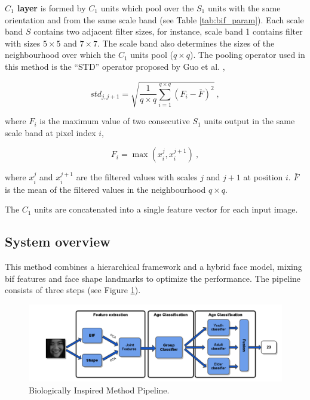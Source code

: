 \textbf{$C_1$ layer} is formed by $C_1$ units which pool over the $S_1$ units with the same orientation and from the same scale band (see Table \ref{tab:bif_param}). Each scale band $S$ contains two adjacent filter sizes, for instance, scale band 1 contains filter with sizes $5\times5$ and $7\times7$. The scale band also determines the sizes of the neighbourhood over which the $C_1$ units pool ($q\times q$). The pooling operator used in this method is the ``STD'' operator proposed by Guo et al. \cite{conf/cvpr/GuoMFH09},

\begin{equation}
std_{j,j+1} = \sqrt{\frac{1}{q\times q}\sum_{i=1}^{q\times q}(F_i - \bar{F})^2} \ ,
\end{equation}

where $F_i$ is the maximum value of two consecutive $S_1$ units output in the same scale band at pixel index $i$, 

\begin{equation}
F_i = \max(x_i^j,x_i^{j+1})\ ,
\end{equation}

where $x_i^j$ and $x_i^{j+1}$ are the filtered values with scales $j$ and $j+1$ at position $i$. $\bar{F}$ is the mean of the filtered values in the neighbourhood $q\times q$.

The $C_1$ units are concatenated into a single feature vector for each input image.


\subsection{System overview}

This method combines a hierarchical framework and a hybrid face model, mixing \gls{bif} features and face shape landmarks to optimize the performance. The pipeline consists of three steps (see Figure \ref{fig:pipeline}).

\begin{figure}[!h]
	\centering
	\includegraphics[width=\textwidth]{figures/pipeline}
	\caption{Biologically Inspired Method Pipeline.}
	\label{fig:pipeline}
\end{figure}

